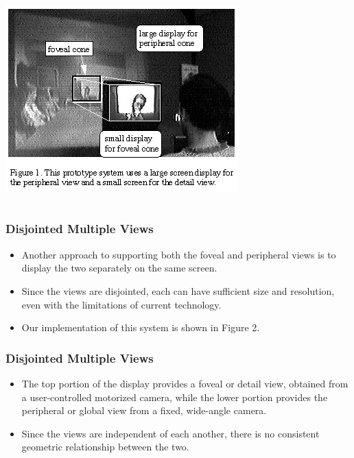 \documentclass{beamer}
\begin{document}
\begin{frame}
\frametitle{}


\begin{columns}

\centerline{\includegraphics[width=0.500000\linewidth,keepaspectratio]{ky_fg1.png}}

\end{columns}

\end{frame}

\begin{frame}
\frametitle{Disjointed Multiple Views}

\begin{itemize}
\item Another approach to supporting both the foveal and peripheral views is to display the two separately on the same screen.
\item Since the views are disjointed, each can have sufficient size and resolution, even with the limitations of current technology.
\item Our implementation of this system is shown in Figure 2.
\end{itemize}

\end{frame}

\begin{frame}
\frametitle{Disjointed Multiple Views}

\begin{itemize}
\item The top portion of the display provides a foveal or detail view, obtained from a user-controlled motorized camera, while the lower portion provides the peripheral or global view from a fixed, wide-angle camera.
\item Since the views are independent of each another, there is no consistent geometric relationship between the two.
\end{itemize}

\end{frame}
\end{document}
